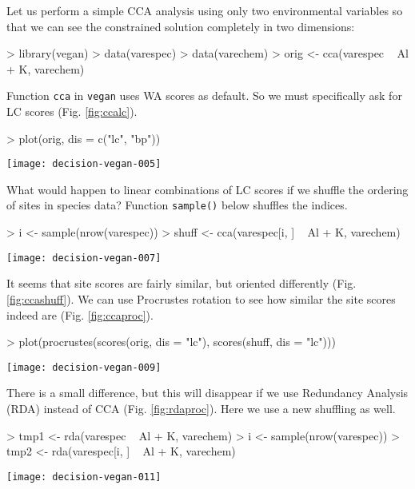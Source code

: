 \documentclass[a4paper,10pt]{amsart}
\begin{document}
Let us perform a simple CCA analysis using only two environmental
variables so that we can see the constrained solution completely in
two dimensions:
\begin{Schunk}
\begin{Sinput}
> library(vegan)
> data(varespec)
> data(varechem)
> orig <- cca(varespec ~ Al + K, varechem)
\end{Sinput}
\end{Schunk}
Function \texttt{cca} in \texttt{vegan} uses WA scores as
default. So we must specifically ask for LC scores
(Fig. \ref{fig:ccalc}).
\begin{Schunk}
\begin{Sinput}
> plot(orig, dis = c("lc", "bp"))
\end{Sinput}
\end{Schunk}
\begin{SCfigure}
\texttt{[image: decision-vegan-005]}
\caption{LC scores in CCA of the original data.}
\label{fig:ccalc}
\end{SCfigure}

What would happen to linear combinations of LC scores if we shuffle
the ordering of sites in species data?  Function \texttt{sample()} below
shuffles the indices.
\begin{Schunk}
\begin{Sinput}
> i <- sample(nrow(varespec))
> shuff <- cca(varespec[i, ] ~ Al + K, varechem)
\end{Sinput}
\end{Schunk}
\begin{SCfigure}
\texttt{[image: decision-vegan-007]}
\caption{LC scores of shuffled species data.}
\label{fig:ccashuff}
\end{SCfigure}
It seems that site scores are fairly similar, but oriented differently
(Fig. \ref{fig:ccashuff}).  We can use Procrustes rotation to see how
similar the site scores indeed are (Fig. \ref{fig:ccaproc}).
\begin{Schunk}
\begin{Sinput}
> plot(procrustes(scores(orig, dis = "lc"), scores(shuff, dis = "lc")))
\end{Sinput}
\end{Schunk}
\begin{SCfigure}
\texttt{[image: decision-vegan-009]}
\caption{Procrustes rotation of LC scores from CCA of original and shuffled data.}
\label{fig:ccaproc}
\end{SCfigure}
There is a small difference, but this will disappear if we use
Redundancy Analysis (RDA) instead of CCA
(Fig. \ref{fig:rdaproc}). Here we use a new shuffling as well.
\begin{Schunk}
\begin{Sinput}
> tmp1 <- rda(varespec ~ Al + K, varechem)
> i <- sample(nrow(varespec))
> tmp2 <- rda(varespec[i, ] ~ Al + K, varechem)
\end{Sinput}
\end{Schunk}
\begin{SCfigure}
\texttt{[image: decision-vegan-011]}
\caption{Procrustes rotation of LC scores in RDA of the original and shuffled data.}
\label{fig:rdaproc}
\end{SCfigure}
\end{document}
